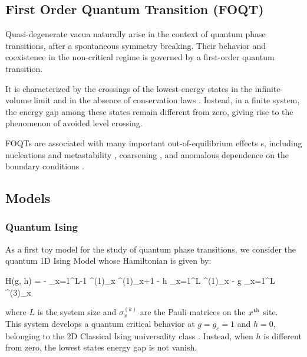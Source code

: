 \subsection{First Order Quantum Transition (FOQT)}
\label{FOQTeq}

Quasi-degenerate vacua naturally arise in the context of quantum phase transitions, after a spontaneous symmetry breaking. Their behavior and coexistence in the non-critical regime is governed by a first-order quantum transition.

It is characterized by the crossings of the lowest-energy states in the infinite-volume limit and in the absence of conservation laws \cite{plissetto2023scaling}.
Instead, in a finite system, the energy gap among these states remain different from zero, giving rise to the phenomenon of avoided level crossing.

FOQTs are associated with many important out-of-equilibrium effects s, including nucleations and metastability \cite{binder1987theory,bray2002theory}, coarsening \cite{chandran2012kibble}, and anomalous dependence on the boundary conditions \cite{pelissetto2020scaling,panagopoulos2018dynamic,campostrini2015quantum,pelissetto2018finite,rossini2018ground}.

\subsection{Models}
\label{Models}

\subsubsection{Quantum Ising}
\label{QIsing}

As a first toy model for the study of quantum phase transitions, we consider the quantum 1D Ising Model whose Hamiltonian is given by:

	H(g, h) = - \sum_{x=1}^{L-1} \sigma^{(1)}_x \sigma^{(1)}_{x+1}
	- h \sum_{x=1}^L \sigma^{(1)}_x - g \sum_{x=1}^L \sigma^{(3)}_x \pc
\ee

where $L$ is the system size and $\sigma_x^{(k)}$ are the Pauli matrices on the 
$x^{\rm th}$ site.\\

This system develops a quantum critical behavior at $g = g_c = 1$
and $h=0$, belonging to the 2D Classical Ising universality class \cite{S99}. Instead, 
when $h$ is different from zero, the lowest states energy gap is not vanish.


